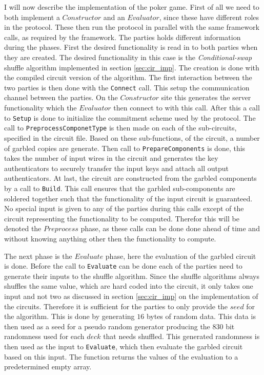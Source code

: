 \documentclass[twoside,11pt,openright]{report}
\newcommand{\CS}{\textit{Conditional-swap} }
\begin{document}
I will now describe the implementation of the poker game. First of all we need to both implement a $Constructor$ and an $Evaluator$, since these have different roles in the protocol. These then run the protocol in parallel with the same framework calls, as required by the framework. The parties holds different information during the phases. First the desired functionality is read in to both parties when they are created. The desired functionality in this case is the \CS shuffle algorithm implemented in section \ref{sec:cir_imp}. The creation is done with the compiled circuit version of the algorithm. The first interaction between the two parties is then done with the \verb|Connect| call. This setup the communication channel between the parties. On the $Constructor$ site this generates the server functionality which the $Evaluator$ then connect to with this call. After this a call to \verb|Setup| is done to initialize the commitment scheme used by the protocol. The call to \verb|PreprocessComponetType| is then made on each of the sub-circuits, specified in the circuit file. Based on these sub-functions, of the circuit, a number of garbled copies are generate. Then call to \verb|PrepareComponents| is done, this takes the number of input wires in the circuit and generates the key authenticators to securely transfer the input keys and attach all output authenticators. At last, the circuit are constructed from the garbled components by a call to \verb|Build|. This call ensures that the garbled sub-components are soldered together such that the functionality of the input circuit is guaranteed. No special input is given to any of the parties during this calls except of the circuit representing the functionality to be computed. Therefor this will be denoted the $Preprocess$ phase, as these calls can be done done ahead of time and without knowing anything other then the functionality to compute.

The next phase is the $Evaluate$ phase, here the evaluation of the garbled circuit is done. Before the call to \verb|Evaluate| can be done each of the parties need to generate their inputs to the shuffle algorithm. Since the shuffle algorithms always shuffles the same value, which are hard coded into the circuit, it only takes one input and not two as discussed in section \ref{sec:cir_imp} on the implementation of the circuits. Therefore it is sufficient for the parties to only provide the $seed$ for the algorithm. This is done by generating $16$ bytes of random data. This data is then used as a seed for a pseudo random generator producing the $830$ bit randomness used for each $deck$ that needs shuffled. This generated randomness is then used as the input to \verb|Evaluate|, which then evaluate the garbled circuit based on this input. The function returns the values of the evaluation to a predetermined empty array.
\end{document}
